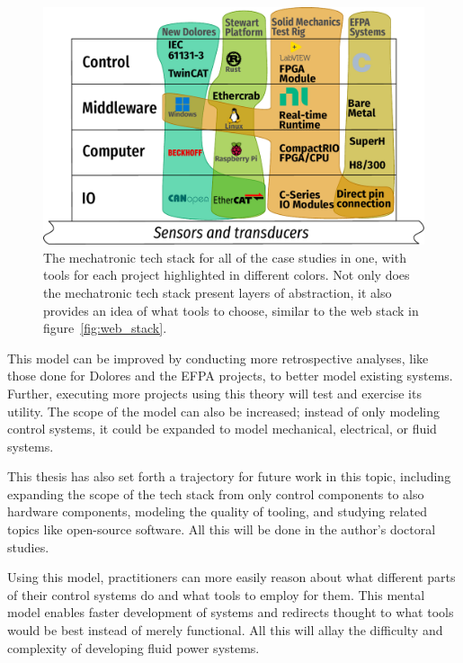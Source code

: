 \documentclass[english,12pt,a4paper,pdftex,eng,utf8]{aaltothesis}
\begin{document}
\begin{figure}[h]
  \centering
  \includegraphics[width=\textwidth]{assets/mechatronic_tech_stack_filled}
  \caption{The mechatronic tech stack for all of the case studies in one, with tools for each project highlighted in different colors.  Not only does the mechatronic tech stack present layers of abstraction, it also provides an idea of what tools to choose, similar to the web stack in figure~\ref{fig:web_stack}.}\label{fig:mechatronic_tech_stack_filled}
\end{figure}

This model can be improved by conducting more retrospective analyses, like those done for Dolores and the EFPA projects, to better model existing systems. Further, executing more projects using this theory will test and exercise its utility. The scope of the model can also be increased; instead of only modeling control systems, it could be expanded to model mechanical, electrical, or fluid systems.

This thesis has also set forth a trajectory for future work in this topic, including expanding the scope of the tech stack from only control components to also hardware components, modeling the quality of tooling, and studying related topics like open-source software.  All this will be done in the author's doctoral studies.

Using this model, practitioners can more easily reason about what different parts of their control systems do and what tools to employ for them. This mental model enables faster development of systems and redirects thought to what tools would be best instead of merely functional. All this will allay the difficulty and complexity of developing fluid power systems.

\clearpage

{}



\end{document}

